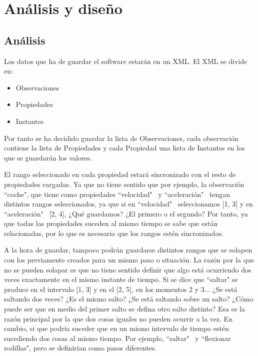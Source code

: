 \chapter{An\'{a}lisis y dise\~{n}o}


\section{An\'{a}lisis}
Los datos que ha de guardar el software estar\'an en un XML. El XML se divide en:
\begin{itemize}
	\item Observaciones
	\item Propiedades
	\item Instantes
\end{itemize}

Por tanto se ha decidido guardar la lista de Observaciones, cada observaci\'on contiene la lista de Propiedades 
y cada Propiedad una lista de Instantes en los que se guardar\'an los valores.

El rango seleccionado en cada propiedad estar\'a sincronizado con el resto de propiedades cargadas. 
Ya que no tiene sentido que por ejemplo, la observaci\'on ``coche", 
que tiene como propiedades ``velocidad" \ y ``aceleraci\'on" \ tengan distintos rangos 
seleccionados, ya que si en ``velocidad" \ seleccionamos [1, 3] y en ``aceleraci\'on" \ [2, 4], 
¿Qu\'e guardamos? ¿El primero o el segundo? Por tanto, ya que todas las propiedades suceden al
mismo tiempo se sabe que est\'an relacionadas, por lo que es necesario que los rangos est\'en
sincronizados.

A la hora de guardar, tampoco podr\'an guardarse distintos rangos que se solapen con los
previamente creados para un mismo paso o situaci\'on. La razón por la que no se pueden 
solapar es que no tiene sentido definir que algo est\'a 
ocurriendo dos veces exactamente en el mismo instante de tiempo. Si se dice que ``saltar"
se produce en el intervalo [1, 3] y en el [2, 5], en los momentos 2 y 3...
¿Se est\'a saltando dos veces? ¿Es el mismo salto? ¿Se est\'a saltando sobre un salto? ¿C\'omo 
puede ser que en medio del primer salto se defina otro salto distinto? Esa es la raz\'on principal
por la que dos cosas iguales no pueden ocurrir a la vez. En cambio, si que podr\'ia suceder
que en un mismo intervalo de tiempo est\'en sucediendo dos cosas al mismo tiempo. Por ejemplo,
``saltar" \ y ``flexionar rodillas", pero se definir\'ian como pasos diferentes.

